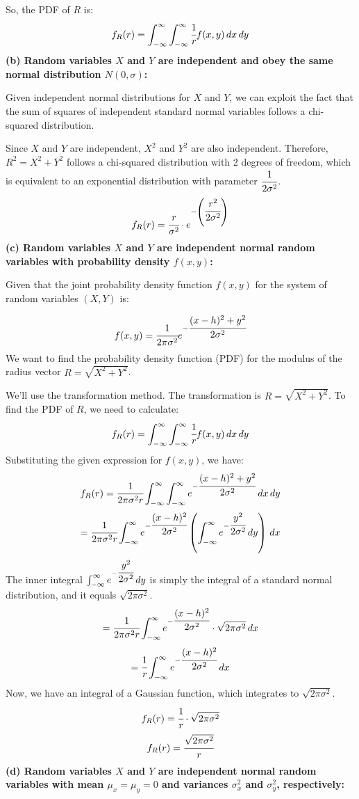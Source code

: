 \documentclass{article}
\begin{document}
\begin{enumerate}
    So, the PDF of $R$ is:
    \[ 
        f_R(r) = \int_{-\infty}^{\infty} \int_{-\infty}^{\infty} \cfrac{1}{r} f(x, y) \,dx \,dy
    \]
    \textbf{(b) Random variables $X$ and $Y$ are independent and obey the same normal distribution $N(0, \sigma)$:}

    Given independent normal distributions for $X$ and $Y$, we can exploit the fact that the sum of squares of independent standard normal variables follows a chi-squared distribution.

    Since $X$ and $Y$ are independent, $X^2$ and $Y^2$ are also independent. Therefore, $R^2 = X^2 + Y^2$ follows a chi-squared distribution with 2 degrees of freedom, which is equivalent to an exponential distribution with parameter $\cfrac{1}{2\sigma^2}$.
    \[ 
        f_R(r) = \cfrac{r}{\sigma^2}\cdot e^{-\left(\cfrac{r^2}{2\sigma^2}\right)} 
    \]
    \textbf{(c) Random variables $X$ and $Y$ are independent normal random variables with probability density $f(x, y)$:}

    Given that the joint probability density function \( f(x, y) \) for the system of random variables \( (X, Y) \) is:

    \[ 
        f(x, y) = \cfrac{1}{2\pi\sigma^2} e^{-\cfrac{(x - h)^2 + y^2}{2\sigma^2}} 
    \]
    We want to find the probability density function (PDF) for the modulus of the radius vector \( R = \sqrt{X^2 + Y^2} \).

    We'll use the transformation method. The transformation is \( R = \sqrt{X^2 + Y^2} \). To find the PDF of \( R \), we need to calculate:
    \[ 
        f_R(r) = \int_{-\infty}^{\infty} \int_{-\infty}^{\infty} \cfrac{1}{r} f(x, y) \,dx \,dy 
    \]
    Substituting the given expression for \( f(x, y) \), we have:
    \[ 
        f_R(r) = \cfrac{1}{2\pi\sigma^2r} \int_{-\infty}^{\infty} \int_{-\infty}^{\infty} e^{-\cfrac{(x - h)^2 + y^2}{2\sigma^2}} \,dx \,dy 
    \]
    \[ 
        = \cfrac{1}{2\pi\sigma^2r} \int_{-\infty}^{\infty} e^{-\cfrac{(x - h)^2}{2\sigma^2}} \left( \int_{-\infty}^{\infty} e^{-\cfrac{y^2}{2\sigma^2}} \,dy \right) \,dx 
    \]
    The inner integral \( \int_{-\infty}^{\infty} e^{-\cfrac{y^2}{2\sigma^2}} \,dy \) is simply the integral of a standard normal distribution, and it equals \( \sqrt{2\pi\sigma^2} \).
    \[ 
        = \cfrac{1}{2\pi\sigma^2r} \int_{-\infty}^{\infty} e^{-\cfrac{(x - h)^2}{2\sigma^2}} \cdot \sqrt{2\pi\sigma^2} \,dx
    \]
    \[ 
        = \cfrac{1}{r} \int_{-\infty}^{\infty} e^{-\cfrac{(x - h)^2}{2\sigma^2}} \,dx
    \]
    Now, we have an integral of a Gaussian function, which integrates to \( \sqrt{2\pi\sigma^2} \).
    \[ 
        f_R(r) = \cfrac{1}{r} \cdot \sqrt{2\pi\sigma^2} 
    \]
    \[ 
        f_R(r) = \cfrac{\sqrt{2\pi\sigma^2}}{r}
    \]
    \textbf{(d) Random variables $X$ and $Y$ are independent normal random variables with mean $\mu_x = \mu_y = 0$ and variances $\sigma_x^2$ and $\sigma_y^2$, respectively:}


\end{enumerate}
\end{document}
